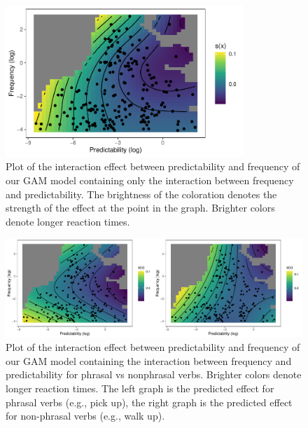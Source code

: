 \documentclass[
  authoryear,
  preprint,
  1p,
  onecolumn]{elsarticle}
\begin{document}
\begin{figure}[H]

{\centering \includegraphics[width=0.8\textwidth,height=\textheight]{quarto-writeup_files/figure-pdf/gam2dplot1-1.pdf}

}

\caption{Plot of the interaction effect between predictability and
frequency of our GAM model containing only the interaction between
frequency and predictability. The brightness of the coloration denotes
the strength of the effect at the point in the graph. Brighter colors
denote longer reaction times.}

\end{figure}%

\begin{figure}[H]

{\centering \includegraphics{quarto-writeup_files/figure-pdf/gam2dplot2-1.pdf}

}

\caption{Plot of the interaction effect between predictability and
frequency of our GAM model containing the interaction between frequency
and predictability for phrasal vs nonphrasal verbs. Brighter colors
denote longer reaction times. The left graph is the predicted effect for
phrasal verbs (e.g., pick up), the right graph is the predicted effect
for non-phrasal verbs (e.g., walk up).}

\end{figure}%
\end{document}
